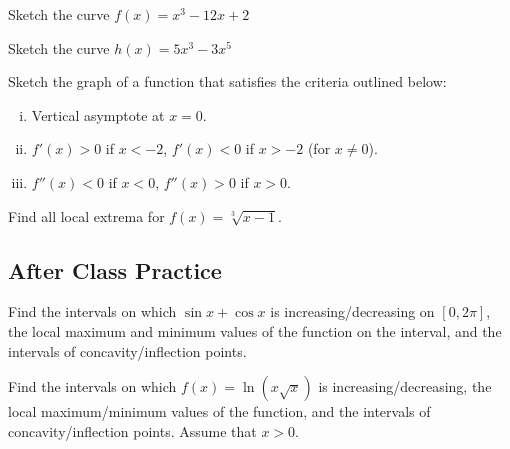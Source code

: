 \documentclass[notes]{subfiles}
\begin{document}
		\begin{ex}
			Sketch the curve \(f(x)=x^3 - 12x + 2\)
		\end{ex}
			
		\begin{ex}
			Sketch the curve \(h(x) = 5x^3-3x^5\)
		\end{ex}
			\newpage
			
		\begin{ex}
			Sketch the graph of a function that satisfies the criteria outlined below:
				\begin{enumerate}[(i)]
					\item Vertical asymptote at \(x = 0\).
					\item \(f'(x) > 0\) if \(x < -2\), \(f'(x) < 0\) if \(x > -2\) (for \(x\neq 0\)).  
					\item \(f''(x) < 0\) if \(x < 0\), \(f''(x) > 0\) if \(x > 0\).
				\end{enumerate}
		\end{ex}
			
		\begin{ex}
			Find all local extrema for \(f(x) = \sqrt[3]{x-1}\).
		\end{ex}
			\newpage
			
			

	\subsection*{After Class Practice}
		\begin{ex}
			Find the intervals on which \(\sin x + \cos x\) is increasing/decreasing on \([0,2\pi]\), the local maximum and minimum values of the function on the interval, and the intervals of concavity/inflection points.
		\end{ex}
		
		\begin{ex}
			Find the intervals on which \(f(x) = \ln (x\sqrt{x})\) is increasing/decreasing, the local maximum/minimum values of the function, and the intervals of concavity/inflection points. Assume that \(x > 0\).
		\end{ex}	
			\newpage
			
\end{document}
